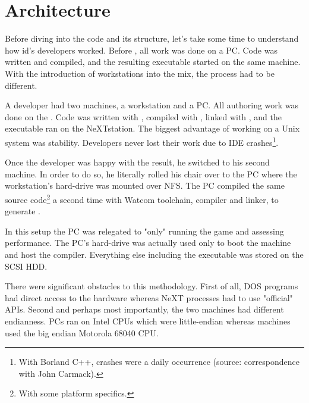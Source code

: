 \section{Architecture}
Before diving into the code and its structure, let's take some time to understand how id's developers worked. Before \doom, all work was done on a PC. Code was written and compiled, and the resulting executable started on the same machine. With the introduction of \NeXT workstations into the mix, the process had to be different.\\
\par
A developer had two machines, a \NeXT workstation and a PC. All authoring work was done on the \NeXTns{}. Code was written with , compiled with , linked with , and the executable ran on the NeXTstation. The biggest advantage of working on a Unix system was stability. Developers never lost their work due to IDE crashes\footnote{With Borland C++, crashes were a daily occurrence (source: correspondence with John Carmack).}.\\
\par
Once the developer was happy with the result, he switched to his second machine. In order to do so, he literally rolled his chair over to the PC where the \NeXT workstation's hard-drive was mounted over NFS. The PC compiled the same source code\footnote{With some platform specifics.} a second time with Watcom toolchain,  compiler and  linker, to generate . \\
\par
 In this setup the PC was relegated to "only" running the game and assessing performance. The PC's hard-drive was actually used only to boot the machine and host the  compiler. Everything else including the  executable was stored on the \NeXT SCSI HDD.\\
\par
There were significant obstacles to this methodology. First of all, DOS programs had direct access to the hardware whereas NeXT processes had to use "official" APIs. Second and perhaps most importantly, the two machines had different endianness. PCs ran on Intel CPUs which were little-endian whereas \NeXT machines used the big endian Motorola 68040 CPU.\\
\vspace{2mm}
\par
\begin{figure}[H]
\centering
{}
\end{figure}
\par



